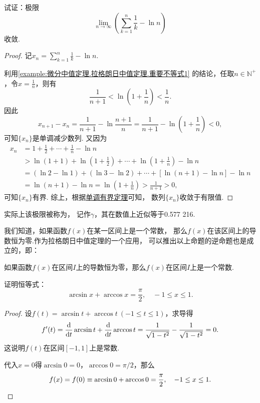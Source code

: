 \begin{example}
试证：极限\[
\lim\limits_{n\to\infty} \left(\sum\limits_{k=1}^n \frac{1}{k} - \ln n\right)
\]收敛.
\begin{proof}
记\(x_n = \sum\limits_{k=1}^n \frac{1}{k} - \ln n\).

利用\cref{example:微分中值定理.拉格朗日中值定理.重要不等式1} 的结论，任取\(n\in\mathbb{N}^+\)，令\(x=\frac{1}{n}\)，则有\[
\frac{1}{n+1} < \ln(1+\frac{1}{n}) < \frac{1}{n}.
\]因此\[
x_{n+1} - x_n = \frac{1}{n+1} - \ln\frac{n+1}{n}
= \frac{1}{n+1} - \ln(1+\frac{1}{n}) < 0,
\]可知\(\{x_n\}\)是单调减少数列.
又因为\begin{align*}
x_n &= 1 + \frac{1}{2} + \dotsb + \frac{1}{n} - \ln n \\
&> \ln(1+1) + \ln(1+\frac{1}{2}) + \dotsb + \ln(1+\frac{1}{n}) - \ln n \\
&= (\ln2-\ln1)+(\ln3-\ln2)+\dotsb+[\ln(n+1)-\ln n] - \ln n \\
&= \ln(n+1) - \ln n
= \ln(1+\frac{1}{n})
> \frac{1}{n+1} > 0,
\end{align*}
可知\(\{x_n\}\)有界.
综上，根据\hyperref[theorem:极限.函数的单调有界定理]{单调有界定理}可知，
数列\(\{x_n\}\)收敛于有限值.
\end{proof}
实际上该极限被称为，
记作\(\gamma\)，其在数值上近似等于0.577 216.
\end{example}

我们知道，如果函数\(f(x)\)在某一区间上是一个常数，
那么\(f(x)\)在该区间上的导数恒为零.作为拉格朗日中值定理的一个应用，
可以推出以上命题的逆命题也是成立的，即：
\begin{theorem}
如果函数\(f(x)\)在区间\(I\)上的导数恒为零，那么\(f(x)\)在区间\(I\)上是一个常数.
\end{theorem}

\begin{example}
证明恒等式：\[
\arcsin x + \arccos x = \frac{\pi}{2},
\quad -1 \leq x \leq 1.
\]
\begin{proof}
设\(f(t) = \arcsin t + \arccos t\ (-1 \leq t \leq 1)\)，求导得\[
	f'(t) = \dv{t} \arcsin t + \dv{t} \arccos t
	= \frac{1}{\sqrt{1-t^2}} - \frac{1}{\sqrt{1-t^2}} = 0.
\]
这说明\(f(t)\)在区间\([-1,1]\)上是常数.

代入\(x=0\)得\(\arcsin 0 = 0\)，\(\arccos 0 = \pi/2\)，那么\[
	f(x) = f(0) \equiv \arcsin 0 + \arccos 0 = \frac{\pi}{2},
	\quad -1 \leq x \leq 1.
	\qedhere
\]
\end{proof}
\end{example}

